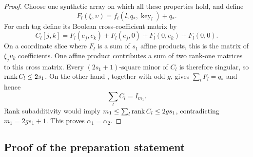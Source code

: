 \begin{proof}
Choose one synthetic array on which all these properties hold,
and define
\[
 F_l(\xi,\upsilon)
   =f_i(l,q_*,\operatorname{key}_l)+q_*.
 \]
For each tag define its Boolean cross-coefficient matrix by
\[
 C_l[j,k]=F_l(e_j,e_k)+F_l(e_j,0)
                 +F_l(0,e_k)+F_l(0,0).
 \]
On a coordinate slice where \(F_l\) is a sum of \(s_1\)
affine products, this is the matrix of \(\xi_j\upsilon_k\)
coefficients.  One affine product contributes a sum of two
rank-one matrices to this cross matrix.  Every
\((2s_1+1)\)-square minor of \(C_l\) is therefore singular,
so \(\operatorname{rank} C_l\le2s_1\).
On the other hand , together with
odd \(g\), gives \(\sum_lF_l=q_*\) and hence
\[
 \sum_l C_l=I_{m_1}.
 \]
Rank subadditivity would imply
\(m_1\le\sum_l\operatorname{rank} C_l\le2gs_1\), contradicting
\(m_1=2gs_1+1\).  This proves \(\alpha_1=\alpha_2\).
\end{proof}

\subsection{Proof of the preparation statement}

